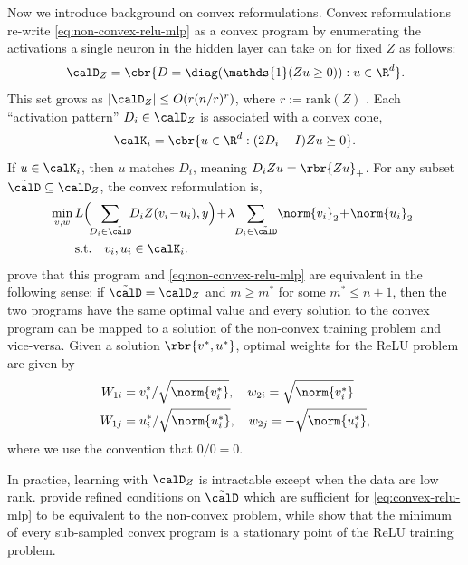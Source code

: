 Now we introduce background on convex reformulations.
Convex reformulations re-write \cref{eq:non-convex-relu-mlp} as a convex
program by enumerating the activations a single neuron in the
hidden layer can take on for fixed \( Z \) as follows:
\[ \calD_Z = \cbr{D = \diag(\mathds{1}(Z u \geq 0)) : u \in \R^d}. \]
This set grows as \(|\calD_Z| \le O(r(n/r)^r)\), where \(r := \text{rank}(Z)\)
\citep{pilanci2020convexnn}.
Each ``activation pattern'' \( D_i \in \calD_{Z} \) is associated with
a convex cone,
\[
	\calK_i = \cbr{u \in \R^d : (2D_i - I) Z u \succeq 0}.
\]
If \( u \in \calK_i \), then \( u \) matches \( D_i \), meaning \( D_i Z u = \rbr{Z u}_+ \).
For any subset \( \tilde \calD \subseteq \calD_Z \),
the convex reformulation is,
\begin{equation}\label{eq:convex-relu-mlp}
	\begin{aligned}
		\!\!\! \min_{v, w} \, & L\Big(\!\!\sum_{D_i \in \tilde \calD}\!\! D_i Z (v_i \!-\! u_i), y\Big)\!+\!\lambda\!\sum_{D_i \in \tilde \calD}\!\norm{v_i}_2\!+\!\norm{u_i}_2 \\
		                      & \text{s.t.} \quad v_i, u_i \in \calK_i.
	\end{aligned}
\end{equation}
\citet{pilanci2020convexnn} prove that this program and \cref{eq:non-convex-relu-mlp}
are equivalent in the following sense:
if \( \tilde \calD = \calD_Z \) and \( m \geq m^* \) for some \( m^* \leq n + 1 \),
then the two programs have the same optimal value and every solution to the convex program
can be mapped to a solution of the non-convex training problem and vice-versa.
Given a solution \( \rbr{v^*, u^*} \), optimal weights
for the ReLU problem are given by
\begin{equation}\label{eq:convex-to-relu}
	\begin{aligned}
		W_{1i} & = v_i^*/ \sqrt{\norm{v_i^*}}, \quad w_{2i} = \sqrt{\norm{v_i^*}}
		\\
		W_{1j} & = u_i^*/ \sqrt{\norm{u_i^*}}, \quad w_{2j} = -\sqrt{\norm{u_i^*}},
	\end{aligned}
\end{equation}
where we use the convention that \( 0/0 = 0 \).

In practice, learning with \( \calD_{Z} \) is intractable except when the data
are low rank.
\citet{mishkin2022convex} provide refined conditions on \( \tilde \calD \)
which are sufficient for \cref{eq:convex-relu-mlp} to be equivalent to the
non-convex problem, while \citet{wang2021hidden} show that
the minimum of every sub-sampled convex program is a stationary point of the
ReLU training problem.

